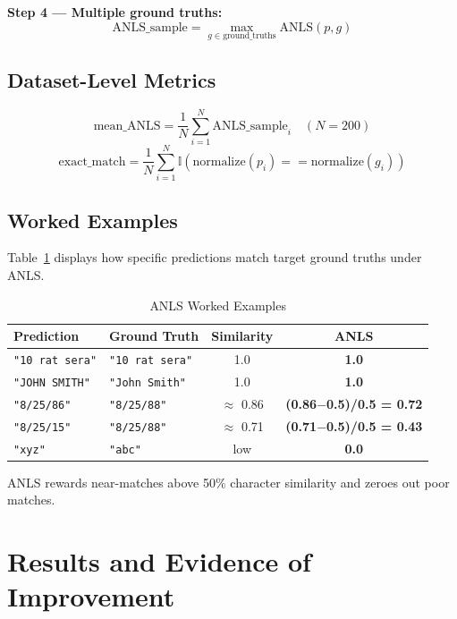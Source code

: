 \documentclass[11pt,a4paper]{article}
\begin{document}
\noindent\textbf{Step 4 --- Multiple ground truths:}
\begin{equation}
\text{ANLS\_sample} = \max_{g \in \text{ground\_truths}} \text{ANLS}(p, g)
\end{equation}

\subsection{Dataset-Level Metrics}
\begin{equation}
\text{mean\_ANLS} = \frac{1}{N} \sum_{i=1}^N \text{ANLS\_sample}_i \quad (N = 200)
\end{equation}
\begin{equation}
\text{exact\_match} = \frac{1}{N} \sum_{i=1}^N \mathbb{I}(\text{normalize}(p_i) == \text{normalize}(g_i))
\end{equation}

\subsection{Worked Examples}
Table~\ref{tab:anls_worked_examples} displays how specific predictions match target ground truths under ANLS.

\begin{table}[H]
\centering
\caption{ANLS Worked Examples}
\label{tab:anls_worked_examples}
\begin{tabular}{|l|l|c|c|}
\hline
\textbf{Prediction} & \textbf{Ground Truth} & \textbf{Similarity} & \textbf{ANLS} \\ \hline
\texttt{"10 rat sera"} & \texttt{"10 rat sera"} & 1.0 & \textbf{1.0} \\ \hline
\texttt{"JOHN SMITH"} & \texttt{"John Smith"} & 1.0 & \textbf{1.0} \\ \hline
\texttt{"8/25/86"} & \texttt{"8/25/88"} & $\approx$ 0.86 & \textbf{(0.86$-$0.5)/0.5 = 0.72} \\ \hline
\texttt{"8/25/15"} & \texttt{"8/25/88"} & $\approx$ 0.71 & \textbf{(0.71$-$0.5)/0.5 = 0.43} \\ \hline
\texttt{"xyz"} & \texttt{"abc"} & low & \textbf{0.0} \\ \hline
\end{tabular}
\end{table}

ANLS rewards near-matches above 50\% character similarity and zeroes out poor matches.

\newpage
\section{Results and Evidence of Improvement}
\end{document}
